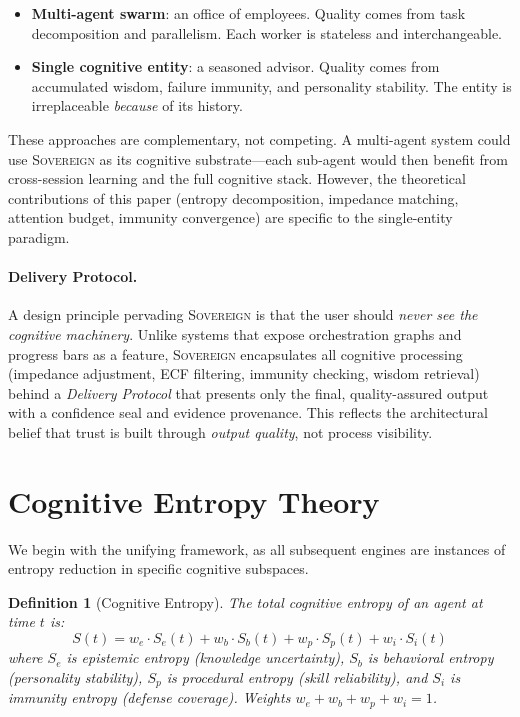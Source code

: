 \documentclass[11pt,a4paper]{article}
\newtheorem{definition}{Definition}
\begin{document}
\begin{itemize}[nosep]
  \item \textbf{Multi-agent swarm}: an office of employees.
    Quality comes from task decomposition and parallelism.
    Each worker is stateless and interchangeable.
  \item \textbf{Single cognitive entity}: a seasoned advisor.
    Quality comes from accumulated wisdom, failure immunity,
    and personality stability. The entity is irreplaceable
    \emph{because} of its history.
\end{itemize}

These approaches are complementary, not competing. A multi-agent system
could use \textsc{Sovereign} as its cognitive substrate---each sub-agent
would then benefit from cross-session learning and the full cognitive
stack. However, the theoretical contributions of this paper (entropy
decomposition, impedance matching, attention budget, immunity convergence)
are specific to the single-entity paradigm.

\paragraph{Delivery Protocol.}
A design principle pervading \textsc{Sovereign} is that the
user should \emph{never see the cognitive machinery}. Unlike systems
that expose orchestration graphs and progress bars as a feature,
\textsc{Sovereign} encapsulates all cognitive processing (impedance
adjustment, ECF filtering, immunity checking, wisdom retrieval) behind
a \emph{Delivery Protocol} that presents only the final, quality-assured
output with a confidence seal and evidence provenance. This reflects
the architectural belief that trust is built through \emph{output quality},
not process visibility.

\section{Cognitive Entropy Theory}
\label{sec:entropy}

We begin with the unifying framework, as all subsequent engines are
instances of entropy reduction in specific cognitive subspaces.

\begin{definition}[Cognitive Entropy]
\label{def:entropy}
The total cognitive entropy of an agent at time $t$ is:
\begin{equation}
  S(t) = w_e \cdot S_e(t) + w_b \cdot S_b(t) + w_p \cdot S_p(t) + w_i \cdot S_i(t)
  \label{eq:entropy}
\end{equation}
where $S_e$ is \emph{epistemic entropy} (knowledge uncertainty), $S_b$ is
\emph{behavioral entropy} (personality stability), $S_p$ is
\emph{procedural entropy} (skill reliability), and $S_i$ is
\emph{immunity entropy} (defense coverage). Weights $w_e + w_b + w_p + w_i = 1$.
\end{definition}
\end{document}

